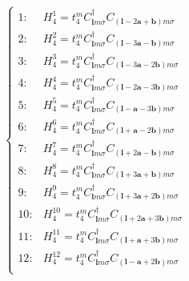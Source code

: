 \documentclass[reprint, aps, prb, showkeys]{revtex4-2}
\begin{document}
\begin{equation}
    \begin{cases}
        1: & H_4^1 = t_4^m C_{\boldsymbol{l}m\sigma}^{\dagger}C_{(\boldsymbol{l}-2\boldsymbol{a}+\boldsymbol{b})m\sigma}\\
        2: & H_4^2 = t_4^m C_{\boldsymbol{l}m\sigma}^{\dagger}C_{(\boldsymbol{l}-3\boldsymbol{a}-\boldsymbol{b})m\sigma}\\
        3: & H_4^3 = t_4^m C_{\boldsymbol{l}m\sigma}^{\dagger}C_{(\boldsymbol{l}-3\boldsymbol{a}-2\boldsymbol{b})m\sigma}\\
        4: & H_4^4 = t_4^m C_{\boldsymbol{l}m\sigma}^{\dagger}C_{(\boldsymbol{l}-2\boldsymbol{a}-3\boldsymbol{b})m\sigma}\\
        5: & H_4^5 = t_4^m C_{\boldsymbol{l}m\sigma}^{\dagger}C_{(\boldsymbol{l}-\boldsymbol{a}-3\boldsymbol{b})m\sigma}\\
        6: & H_4^6 = t_4^m C_{\boldsymbol{l}m\sigma}^{\dagger}C_{(\boldsymbol{l}+\boldsymbol{a}-2\boldsymbol{b})m\sigma}\\
        7: & H_4^7 = t_4^m C_{\boldsymbol{l}m\sigma}^{\dagger}C_{(\boldsymbol{l}+2\boldsymbol{a}-\boldsymbol{b})m\sigma}\\
        8: & H_4^8 = t_4^m C_{\boldsymbol{l}m\sigma}^{\dagger}C_{(\boldsymbol{l}+3\boldsymbol{a}+\boldsymbol{b})m\sigma}\\
        9: & H_4^9 = t_4^m C_{\boldsymbol{l}m\sigma}^{\dagger}C_{(\boldsymbol{l}+3\boldsymbol{a}+2\boldsymbol{b})m\sigma}\\
        10: & H_4^{10} = t_4^m C_{\boldsymbol{l}m\sigma}^{\dagger}C_{(\boldsymbol{l}+2\boldsymbol{a}+3\boldsymbol{b})m\sigma}\\
        11: & H_4^{11} = t_4^m C_{\boldsymbol{l}m\sigma}^{\dagger}C_{(\boldsymbol{l}+\boldsymbol{a}+3\boldsymbol{b})m\sigma}\\
        12: & H_4^{12} = t_4^m C_{\boldsymbol{l}m\sigma}^{\dagger}C_{(\boldsymbol{l}-\boldsymbol{a}+2\boldsymbol{b})m\sigma}\\
    \end{cases} \label{NNNNN}
\end{equation}
\end{document}
